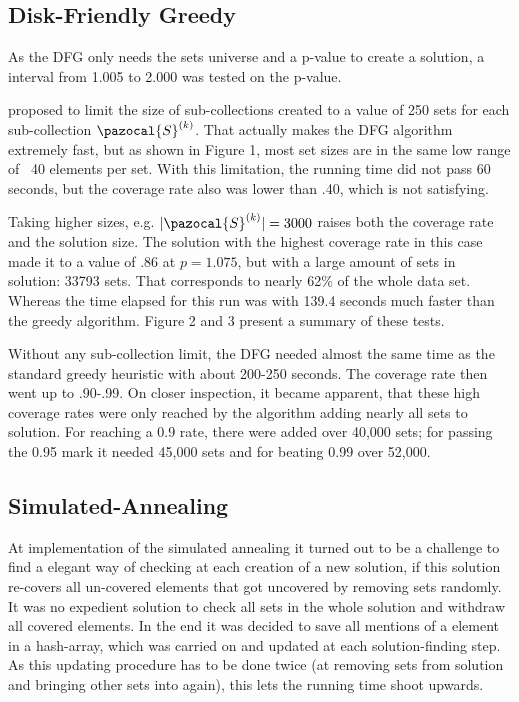 \documentclass[a4paper]{article}
\newcommand{\Sa}{\pazocal{S}}
\begin{document}
\pagebreak



\subsection{Disk-Friendly Greedy}
As the DFG only needs the sets universe and a p-value to create a solution, a interval from 1.005 to 2.000 was tested on the p-value. 

\citeauthor{Cormode} proposed to limit the size of sub-collections created to a value of 250 sets for each sub-collection $\Sa^{(k)}$. That actually makes the DFG algorithm extremely fast, but as shown in Figure 1, most set sizes are in the same low range of ~40 elements per set. With this limitation, the running time did not pass 60 seconds, but the coverage rate also was lower than .40, which is not satisfying. 

Taking higher sizes, e.g. $|\Sa^{(k)} | = 3000$ raises both the coverage rate and the solution size. The solution with the highest coverage rate in this case made it to a value of .86 at $p= 1.075$, but with a large amount of sets in solution: 33793 sets. That corresponds to nearly 62\% of the whole data set. Whereas the time elapsed for this run was with 139.4 seconds much faster than the greedy algorithm. Figure 2 and 3 present a summary of these tests. 

Without any sub-collection limit, the DFG needed almost the same time as the standard greedy heuristic with about 200-250 seconds. The coverage rate then went up to .90-.99. On closer inspection, it became apparent, that these high coverage rates were only reached by the algorithm adding nearly all sets to solution. For reaching a 0.9 rate, there were added over 40,000 sets; for passing the 0.95 mark it needed 45,000 sets and for beating 0.99 over 52,000.



\subsection{Simulated-Annealing}
At implementation of the simulated annealing it turned out to be a challenge to find a elegant way of checking at each creation of a new solution, if this solution re-covers all un-covered elements that got uncovered by removing sets randomly. It was no expedient solution to check all sets in the whole solution and withdraw all covered elements. In the end it was decided to save all mentions of a element in a hash-array, which was carried on and updated at each solution-finding step. As this updating procedure has to be done twice (at removing sets from solution and bringing other sets into again), this lets the running time shoot upwards. 
\end{document}
